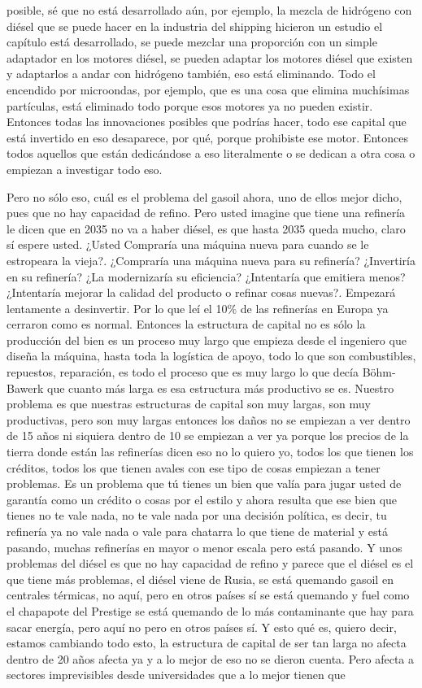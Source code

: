 posible, sé que no está desarrollado aún, por ejemplo, la mezcla de hidrógeno con diésel que se puede hacer en la industria del shipping hicieron un estudio el capítulo está desarrollado, se puede mezclar una proporción con un simple adaptador en los motores diésel, se pueden adaptar los motores diésel que existen y adaptarlos a andar con hidrógeno también, eso está eliminando. Todo el encendido por microondas, por ejemplo, que es una cosa que elimina muchísimas partículas, está eliminado todo porque esos motores ya no pueden existir. Entonces todas las innovaciones posibles que podrías hacer, todo ese capital que está invertido en eso desaparece, por qué, porque prohibiste ese motor. Entonces todos aquellos que están dedicándose a eso literalmente o se dedican a otra cosa o empiezan a investigar todo eso.

Pero no sólo eso, cuál es el problema del gasoil ahora, uno de ellos mejor dicho, pues que no hay capacidad de refino. Pero usted imagine que tiene una refinería le dicen que en 2035 no va a haber diésel, es que hasta 2035 queda mucho, claro sí espere usted. ¿Usted Compraría una máquina nueva para cuando se le estropeara la vieja?. ¿Compraría una máquina nueva para su refinería? ¿Invertiría en su refinería? ¿La modernizaría su eficiencia? ¿Intentaría que emitiera menos? ¿Intentaría mejorar la calidad del producto o refinar cosas nuevas?. Empezará lentamente a desinvertir. Por lo que leí el 10\% de las refinerías en Europa ya cerraron como es normal. Entonces la estructura de capital no es sólo la producción del bien es un proceso muy largo que empieza desde el ingeniero que diseña la máquina, hasta toda la logística de apoyo, todo lo que son combustibles, repuestos, reparación, es todo el proceso que es muy largo lo que decía Böhm-Bawerk que cuanto más larga es esa estructura más productivo se es. Nuestro problema es que nuestras estructuras de capital son muy largas, son muy productivas, pero son muy largas entonces los daños no se empiezan a ver dentro de 15 años ni siquiera dentro de 10 se empiezan a ver ya porque los precios de la tierra donde están las refinerías dicen eso no lo quiero yo, todos los que tienen los créditos, todos los que tienen avales con ese tipo de cosas empiezan a tener problemas. Es un problema que tú tienes un bien que valía para jugar usted de garantía como un crédito o cosas por el estilo y ahora resulta que ese bien que tienes no te vale nada, no te vale nada por una decisión política, es decir, tu refinería ya no vale nada o vale para chatarra lo que tiene de material y está pasando, muchas refinerías en mayor o menor escala pero está pasando. Y unos problemas del diésel es que no hay capacidad de refino y parece que el diésel es el que tiene más problemas, el diésel viene de Rusia, se está quemando gasoil en centrales térmicas, no aquí, pero en otros países sí se está quemando y fuel como el chapapote del Prestige se está quemando de lo más contaminante que hay para sacar energía, pero aquí no pero en otros países sí. Y esto qué es, quiero decir, estamos cambiando todo esto, la estructura de capital de ser tan larga no afecta dentro de 20 años afecta ya y a lo mejor de eso no se dieron cuenta. Pero afecta a sectores imprevisibles desde universidades que a lo mejor tienen que 